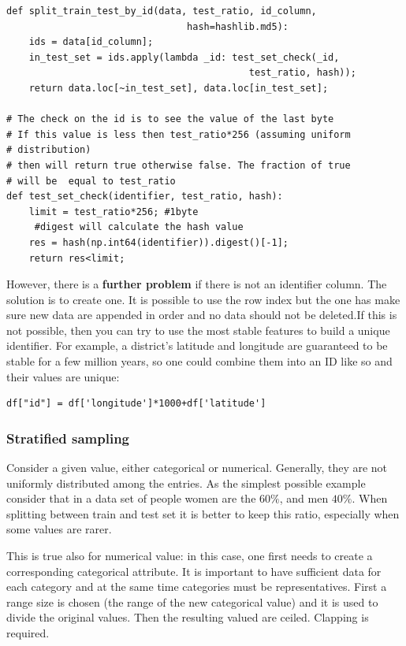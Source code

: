 \documentclass[12pt, letterpaper]{article}
\theoremstyle{definition}
\let\tb\textbf
\begin{document}
\begin{lstlisting}[caption=Example of function to split according to the last by of the hash on the id.]
def split_train_test_by_id(data, test_ratio, id_column, 
		                        hash=hashlib.md5):
    ids = data[id_column];
    in_test_set = ids.apply(lambda _id: test_set_check(_id, 
								           test_ratio, hash));
    return data.loc[~in_test_set], data.loc[in_test_set];

# The check on the id is to see the value of the last byte
# If this value is less then test_ratio*256 (assuming uniform 
# distribution) 
# then will return true otherwise false. The fraction of true
# will be  equal to test_ratio
def test_set_check(identifier, test_ratio, hash):
    limit = test_ratio*256; #1byte
     #digest will calculate the hash value 
    res = hash(np.int64(identifier)).digest()[-1];
    return res<limit;
\end{lstlisting}

However, there is a \tb{further problem} if there is not an identifier column. The solution is to create one. It is possible to use the row index but the one has make sure new data are appended in order and no data should not be deleted.If this is not possible, then you can try to use the most stable features to build a unique identifier. For example, a district's latitude and longitude are guaranteed to be stable for a few million years, so one could combine them into an ID like so and their values are unique:
\begin{lstlisting}[caption="Creating a column ID from stable features such as latitude and longitude.]
df["id"] = df['longitude']*1000+df['latitude']
\end{lstlisting}

\subsubsection{Stratified sampling}
Consider a given value, either categorical or numerical. Generally, they are not uniformly distributed among the entries. As the simplest possible example consider that in a data set of people women are the $60\%$, and men $40\%$. When splitting between train and test set it is better to keep this ratio, especially when some values are rarer.

This is true also for numerical value: in this case, one first needs to create a corresponding categorical attribute. It is important to have sufficient data for each category and at the same time categories must be representatives. First a range size is chosen (the range of the new categorical value) and it is used to divide the original values. Then the resulting valued are ceiled. Clapping is required.
\end{document}
